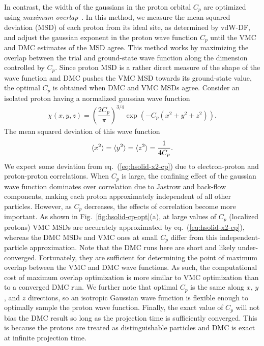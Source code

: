 In contrast, the width of the gaussians in the proton orbital $C_p$ are optimized using \emph{maximum overlap}~\cite{Reatto1982,Natoli1993,Natoli1995}.
In this method, we measure the mean-squared deviation (MSD) of each proton from its ideal site, as determined by vdW-DF, and adjust the gaussian exponent in the proton wave function $C_p$ until the VMC and DMC estimates of the MSD agree.
This method works by maximizing the overlap between the trial and ground-state wave function along the dimension controlled by $C_p$.
Since proton MSD is a rather direct measure of the shape of the wave function and DMC pushes the VMC MSD towards its ground-state value, the optimal $C_p$ is obtained when DMC and VMC MSDs agree.
Consider an isolated proton having a normalized gaussian wave function
\begin{align}
\chi(x, y, z) = \left(\dfrac{2C_p}{\pi}\right)^{3/4} \exp\left(
-C_p(x^2+y^2+z^2)
\right).
\end{align}
The mean squared deviation of this wave function
\begin{align} \label{eq:hsolid-x2-cp}
\braket{x^2}=\braket{y^2}=\braket{z^2}=\dfrac{1}{4C_p}.
\end{align}
We expect some deviation from eq.~(\ref{eq:hsolid-x2-cp}) due to electron-proton and proton-proton correlations. When $C_p$ is large, the confining effect of the gaussian wave function dominates over correlation due to Jastrow and back-flow components, making each proton approximately independent of all other particles.
However, as $C_p$ decreases, the effects of correlation become more important. As shown in Fig.~\ref{fig:hsolid-cp-opt}(a), at large values of $C_p$ (localized protons) VMC MSDs are accurately approximated by eq.~(\ref{eq:hsolid-x2-cp}), whereas the DMC MSDs and VMC ones at small $C_p$ differ from this independent-particle approximation.
Note that the DMC runs here are short and likely under-converged.
Fortunately, they are sufficient for determining the point of maximum overlap between the VMC and DMC wave functions.
As such, the computational cost of maximum overlap optimization is more similar to VMC optimization than to a converged DMC run.
We further note that optimal $C_p$ is the same along $x$, $y$, and $z$ directions, so an isotropic Gaussian wave function is flexible enough to optimally sample the proton wave function.
Finally, the exact value of $C_p$ will not bias the DMC result so long as the projection time is sufficiently converged. This is because the protons are treated as distinguishable particles and DMC is exact at infinite projection time.

